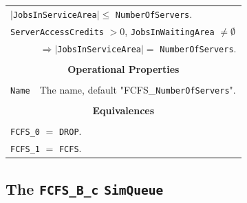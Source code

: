 \documentclass[12pt]{book}
\begin{document}
\begin{tabular}{|l|l|l|l|}
\multicolumn{4}{|l|}{$|$\lstinline|JobsInServiceArea|$| \leq$ \lstinline|NumberOfServers|.} \\
\multicolumn{4}{|l|}{\lstinline|ServerAccessCredits| $> 0$, \lstinline|JobsInWaitingArea| $\neq \emptyset$} \\
    \multicolumn{1}{|l}{}
  & \multicolumn{3}{l|}{$\Rightarrow |$\lstinline|JobsInServiceArea|$| =$ \lstinline|NumberOfServers|.} \\
\hline
\multicolumn{4}{|c|}{} \\
\multicolumn{4}{|c|}{\bf Operational Properties} \\
\multicolumn{4}{|c|}{} \\
\hline
\lstinline|Name| & \multicolumn{3}{|l|}{The name, default "FCFS\_\lstinline{NumberOfServers}".} \\
\hline
\multicolumn{4}{|c|}{} \\
\multicolumn{4}{|c|}{\bf Equivalences} \\
\multicolumn{4}{|c|}{} \\
\hline
\multicolumn{4}{|l|}{\lstinline|FCFS_0| $=$ \lstinline|DROP|.} \\
\multicolumn{4}{|l|}{\lstinline|FCFS_1| $=$ \lstinline|FCFS|.} \\
\hline
\end{tabular}

\subsection{The \lstinline{FCFS_B_c} \lstinline{SimQueue}}
\label{sec:FCFS_B_c}
\end{document}
